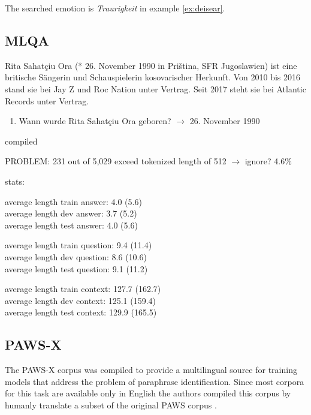 The searched emotion is \emph{Traurigkeit} in example \ref{ex:deisear}.


\subsection{MLQA}

\begin{examples}
	\label{ex:mlqa}
	\item Rita Sahatçiu Ora (* 26. November 1990 in Priština, SFR Jugoslawien) ist eine britische Sängerin und Schauspielerin kosovarischer Herkunft. Von 2010 bis 2016 stand sie bei Jay Z und Roc Nation unter Vertrag. Seit 2017 steht sie bei Atlantic Records unter Vertrag.
\end{examples}

\begin{enumerate}
	\item Wann wurde Rita Sahatçiu Ora geboren? $\rightarrow$ 26. November 1990
\end{enumerate}

\cite{lewis2019mlqa} compiled

PROBLEM: 231 out of 5,029 exceed tokenized length of 512 $\rightarrow$ ignore? 4.6\%

stats:

average length train answer: 4.0 (5.6) \\
average length dev answer: 3.7 (5.2) \\
average length test answer: 4.0 (5.6)

average length train question: 9.4 (11.4) \\
average length dev question: 8.6 (10.6) \\
average length test question: 9.1 (11.2)

average length train context: 127.7 (162.7) \\
average length dev context: 125.1 (159.4) \\
average length test context: 129.9 (165.5)


\subsection{PAWS-X}

The PAWS-X corpus \cite{yang2019paws} was compiled to provide a multilingual source for training models that address the problem of paraphrase identification. 
Since most corpora for this task are available only in English the authors compiled this corpus by humanly translate a subset of the original PAWS corpus \cite{zhang2019paws}.

